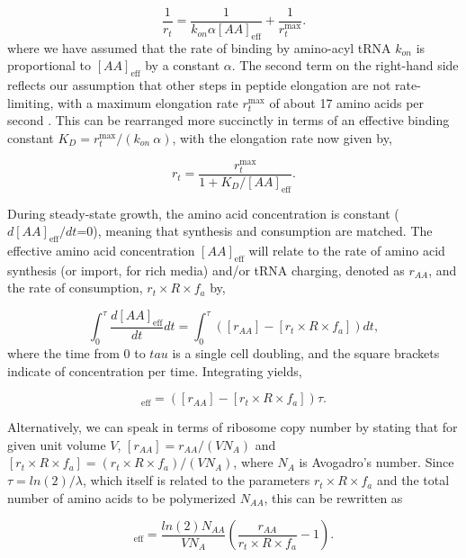 \begin{equation}
\frac{1}{r_t} = \frac{1}{k_{on} \alpha [AA]_{\text{eff}}} + \frac{1}{r_{t}^{\text{max}}}.
\end{equation}
where we have assumed that the rate of binding by amino-acyl tRNA $k_{on}$ is
proportional to $[AA]_{\text{eff}}$ by a constant $\alpha$. The second term on the
right-hand side reflects our assumption that other steps in peptide elongation
are not rate-limiting, with a maximum elongation rate $r_{t}^{\text{max}}$ of
about 17 amino acids per second \cite{dai2016}. This can be rearranged more succinctly in
terms of an effective binding constant $K_D = r_{t}^{\text{max}}/ (k_{on} \ \alpha)$,
with the elongation rate now given by,

\begin{equation}
r_t = \frac{r_{t}^{\text{max}}}{1 + K_D/[AA]_{\text{eff}}}.
\label{eq:rt_kd_simple}
\end{equation}

During steady-state growth, the amino acid concentration is constant
($d[AA]_{\text{eff}}/dt$=0), meaning that synthesis and consumption are matched.
The effective amino acid concentration $[AA]_{\text{eff}}$ will relate to the rate of
amino acid synthesis (or import, for rich media) and/or tRNA charging, denoted
as $r_{AA}$,  and the rate of consumption,
$r_t\times R \times f_a$ by,

\begin{equation}
\int_{0}^{\tau} \frac{d[AA]_{\text{eff}}}{dt} dt =  \int_{0}^{\tau} ([r_{AA}] - [r_t\times R \times f_a]) dt,
\end{equation}
where the time from 0 to $tau$ is a single cell doubling, and the square
brackets indicate of concentration per time. Integrating yields,

\begin{equation}
[AA]_{\text{eff}} =  ([r_{AA}] - [r_t \times R \times f_a]) \tau.
\label{eq:aaeff_concs}
\end{equation}

Alternatively, we can speak in terms of ribosome copy number by stating that
for given unit volume $V$, $[r_{AA}] = r_{AA}/(V N_A)$ and $[r_t\times
R\times f_a] = (r_t \times R \times f_a)/(V N_A)$, where $N_A$ is Avogadro's
number. Since $\tau = ln(2)/\lambda$, which itself is related to the
parameters $r_t\times R \times f_a$ and the total number of amino acids to be
polymerized $N_{AA}$,  this can be rewritten as  

\begin{equation}
[AA]_{\text{eff}} = \frac{ln(2) N_{AA}}{V N_A} \left(\frac{r_{AA}}{r_t\times R\times f_a} - 1 \right) .
\label{eq:aa_final}
\end{equation}


